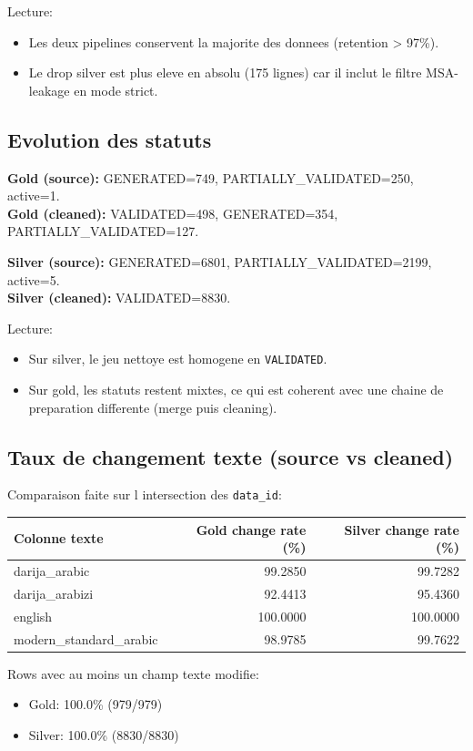 \documentclass[11pt,a4paper]{article}
\begin{document}
\noindent Lecture:
\begin{itemize}[leftmargin=*]
  \item Les deux pipelines conservent la majorite des donnees (retention > 97\%).
  \item Le drop silver est plus eleve en absolu (175 lignes) car il inclut le filtre MSA-leakage en mode strict.
\end{itemize}

\subsection{Evolution des statuts}
\textbf{Gold (source):} GENERATED=749, PARTIALLY\_VALIDATED=250, active=1.\\
\textbf{Gold (cleaned):} VALIDATED=498, GENERATED=354, PARTIALLY\_VALIDATED=127.

\textbf{Silver (source):} GENERATED=6801, PARTIALLY\_VALIDATED=2199, active=5.\\
\textbf{Silver (cleaned):} VALIDATED=8830.

\noindent Lecture:
\begin{itemize}[leftmargin=*]
  \item Sur silver, le jeu nettoye est homogene en \texttt{VALIDATED}.
  \item Sur gold, les statuts restent mixtes, ce qui est coherent avec une chaine de preparation differente (merge puis cleaning).
\end{itemize}

\subsection{Taux de changement texte (source vs cleaned)}
Comparaison faite sur l intersection des \texttt{data\_id}:
\begin{center}
\begin{tabular}{lrr}
\toprule
Colonne texte & Gold change rate (\%) & Silver change rate (\%) \\
\midrule
darija\_arabic & 99.2850 & 99.7282 \\
darija\_arabizi & 92.4413 & 95.4360 \\
english & 100.0000 & 100.0000 \\
modern\_standard\_arabic & 98.9785 & 99.7622 \\
\bottomrule
\end{tabular}
\end{center}

\noindent Rows avec au moins un champ texte modifie:
\begin{itemize}[leftmargin=*]
  \item Gold: 100.0\% (979/979)
  \item Silver: 100.0\% (8830/8830)
\end{itemize}
\end{document}
